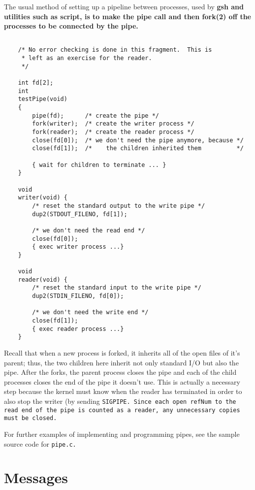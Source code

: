 \documentclass{report}
\begin{document}
The usual method of setting up a pipeline
between processes, used by \bf gsh \rm and utilities such as
script, is to make the \bf pipe \rm call and then \bf fork\rm(2)
off the processes to be connected by the pipe.

\begin{verbatim}

    /* No error checking is done in this fragment.  This is
     * left as an exercise for the reader.
     */

    int fd[2];
    int 
    testPipe(void)
    {
        pipe(fd);      /* create the pipe */
        fork(writer);  /* create the writer process */
        fork(reader);  /* create the reader process */
        close(fd[0]);  /* we don't need the pipe anymore, because */
        close(fd[1]);  /*    the children inherited them          */
    
        { wait for children to terminate ... }
    }

    void 
    writer(void) {
        /* reset the standard output to the write pipe */
        dup2(STDOUT_FILENO, fd[1]);
    
        /* we don't need the read end */
        close(fd[0]);
        { exec writer process ...}
    }

    void 
    reader(void) {
        /* reset the standard input to the write pipe */
        dup2(STDIN_FILENO, fd[0]);
    
        /* we don't need the write end */
        close(fd[1]);
        { exec reader process ...}
    }

\end{verbatim}

Recall that when a new process is forked,
it inherits all of the open files of it's parent; thus, the two
children here inherit not only standard I/O but also the pipe.
After the forks, the parent process closes the pipe and each of
the child processes closes the end of the pipe it doesn't use.
This is actually a necessary step because the kernel must know
when the reader has terminated in order to also stop the writer
(by sending \tt SIGPIPE\rm.
Since each open refNum to the read end of the
pipe is counted as a reader, any unnecessary copies must be
closed.

For further examples of implementing and
programming pipes, see the sample source code for \tt pipe.c\rm.

\section{Messages}
\end{document}
